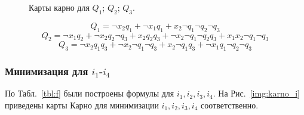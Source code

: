 \documentclass[a4paper, final]{article}
\begin{document}
\begin{figure}[H]
\centering {}  
  \hspace{4ex}
  \caption{Карты карно для  $Q_1$;  $Q_2$;
   $Q_3$.
  }
  \label{img:karno_q}
\end{figure}


\[Q_1 = \neg x_2 q_1 + \neg x_1 q_1 + x_2 \neg q_1 \neg q_2 \neg q_3\]
\[Q_2 = \neg x_1 q_2 + \neg x_2 q_2 \neg q_3 + x_2 q_2 q_3 + \neg x_2 \neg q_1 \neg q_2 q_3 + x_1 x_2 \neg q_1 \neg q_3\]
\[Q_3 = \neg x_2 q_1 q_3 + \neg x_2 \neg q_1 \neg q_3 + x_2 \neg q_1 q_3 + \neg x_1 q_1 \neg q_2 \neg q_3\]

\subsubsection{Минимизация для $i_1$-$i_4$}
По Табл.~\ref{tbl:f} были построены формулы для $i_1, i_2, i_3, i_4$. На Рис.~\ref{img:karno_i} приведены карты Карно для минимизации $i_1, i_2, i_3, i_4$ соответственно.
\end{document}
